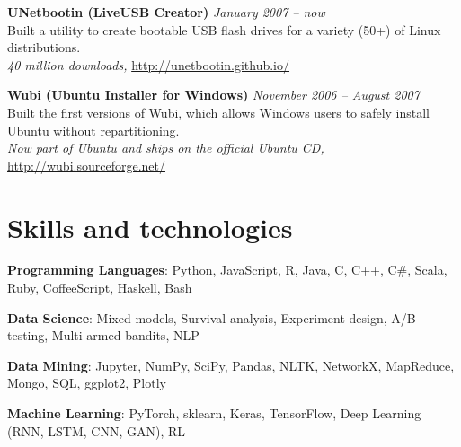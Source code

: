 \documentclass[margin,line]{resume}
\begin{document}
\begin{resume}
\textbf{UNetbootin (LiveUSB Creator)} \hfill \textsl{January 2007 -- now}\\
Built a utility to create bootable USB flash drives for a variety (50+) of Linux distributions.\\ %
\emph{40 million downloads,} \url{http://unetbootin.github.io/}

\textbf{Wubi (Ubuntu Installer for Windows)} \hfill \textsl{November 2006 -- August 2007}\\
Built the first versions of Wubi, which allows Windows users to safely install Ubuntu without repartitioning. \\ %
\emph{Now part of Ubuntu and ships on the official Ubuntu CD,} \url{http://wubi.sourceforge.net/}

\section{\mysidestyle Skills and technologies}

\textbf{Programming Languages}: Python, JavaScript, R, Java, C, C++, C\#, Scala, Ruby, CoffeeScript, Haskell, Bash

\vspace{-4mm}

\textbf{Data Science}: Mixed models, Survival analysis, Experiment design, A/B testing, Multi-armed bandits, NLP

\vspace{-4mm}

\textbf{Data Mining}: Jupyter, NumPy, SciPy, Pandas, NLTK, NetworkX, MapReduce, Mongo, SQL, ggplot2, Plotly



\vspace{-4mm}

\textbf{Machine Learning}: PyTorch, sklearn, Keras, TensorFlow, Deep Learning (RNN, LSTM, CNN, GAN), RL %


\end{resume}
\end{document}
